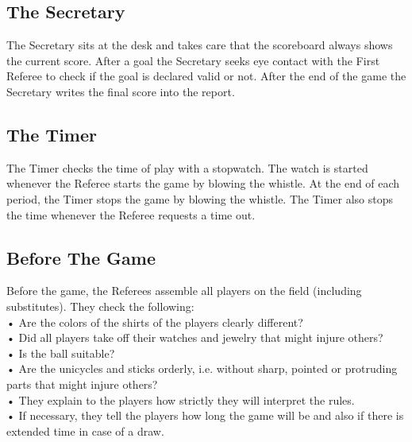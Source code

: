 \subsection{The Secretary}
The Secretary sits at the desk and takes care that the scoreboard always shows the current score. After a goal the
Secretary seeks eye contact with the First Referee to check if the goal is declared valid or not. After the end of the
game the Secretary writes the final score into the report.
\subsection{The Timer}
The Timer checks the time of play with a stopwatch. The watch is started whenever the Referee starts the game by
blowing the whistle. At the end of each period, the Timer stops the game by blowing the whistle. The Timer also stops
the time whenever the Referee requests a time out.
\subsection{Before The Game}
Before the game, the Referees assemble all players on the field (including substitutes). They check the following:\\
• Are the colors of the shirts of the players clearly different?\\
• Did all players take off their watches and jewelry that might injure others?\\
• Is the ball suitable?\\
• Are the unicycles and sticks orderly, i.e. without sharp, pointed or protruding parts that might injure others?\\
• They explain to the players how strictly they will interpret the rules.\\
• If necessary, they tell the players how long the game will be and also if there is extended time in case of a
draw.
